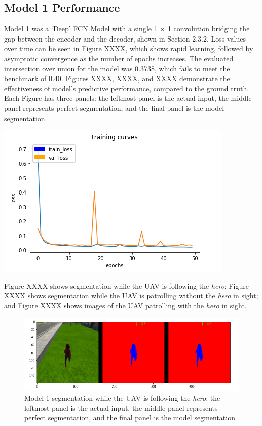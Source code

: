 \documentclass[a4paper]{article}
\begin{document}
\subsection{Model 1 Performance}
\begin{minipage}{0.45\textwidth}
Model 1 was a `Deep' FCN Model with a single 1 $\times$ 1 convolution bridging the gap between the encoder and the decoder, shown in Section 2.3.2. Loss values over time can be seen in Figure XXXX, which shows rapid learning, followed by asymptotic convergence as the number of epochs increases. The evaluated intersection over union for the model was 0.3738, which fails to meet the benchmark of 0.40. Figures XXXX, XXXX, and XXXX demonstrate the effectiveness of model's predictive performance, compared to the ground truth. Each Figure has three panels: the leftmost panel is the actual input, the middle panel represents perfect segmentation, and the final panel is the model segmentation.
\end{minipage}
\hspace{1cm}
\begin{minipage}{0.45\textwidth}
\centering
\includegraphics[scale=0.5]{Model_1}
\end{minipage}

\vspace{0.5cm}

Figure XXXX shows segmentation while the UAV is following the \textit{hero}; Figure XXXX shows segmentation while the UAV is patrolling without the \textit{hero} in sight; and Figure XXXX shows images of the UAV patrolling with the \textit{hero} in sight.
\begin{figure}[h]
\centering
\includegraphics[scale=0.4]{model_1_1}
\caption{Model 1 segmentation while the UAV is following the \textit{hero}: the leftmost panel is the actual input, the middle panel represents perfect segmentation, and the final panel is the model segmentation}
\end{figure}
\end{document}
